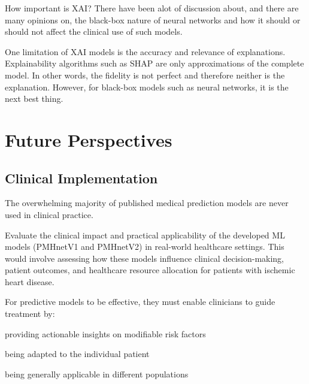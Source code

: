 How important is XAI? 
There have been alot of discussion about, and there are many opinions on, 
the black-box nature of neural networks and 
how it should or should not affect the clinical use of such models.
\autocite{gunningXAI2019, vanderveldenExplainable2022}


One limitation of XAI models is the accuracy and relevance of explanations.
Explainability algorithms such as SHAP are only approximations
of the complete model.
In other words, the fidelity is not perfect and therefore neither
is the explanation.
However, for black-box models such as neural networks,
it is the next best thing.


\section{Future Perspectives}

\subsection{Clinical Implementation}

The overwhelming majority of published medical prediction models 
are never used in clinical practice.
~\autocite{steyerbergPrognosis2013}

Evaluate the clinical impact and practical applicability of the developed ML
models (PMHnetV1 and PMHnetV2) in real-world healthcare settings. This would
involve assessing how these models influence clinical decision-making, patient
outcomes, and healthcare resource allocation for patients with ischemic heart
disease.

For predictive models to be effective,
they must enable clinicians to guide treatment by:
%
\begin{enumerate*}
    \item providing actionable insights on modifiable risk factors
    \item being adapted to the individual patient
    \item being generally applicable in different populations
\end{enumerate*}


